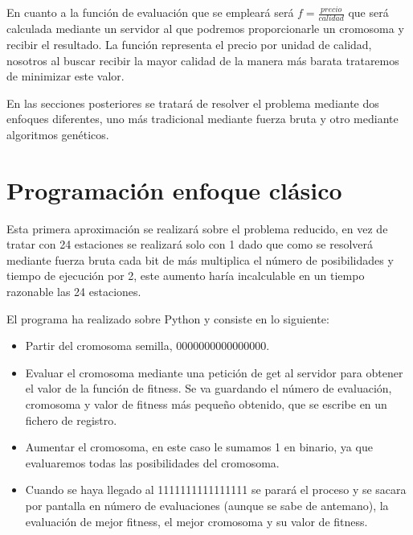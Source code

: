\documentclass[12pt, spanish, pdftex]{UC3M_document}
\begin{document}
En cuanto a la función de evaluación que se empleará será $f=\frac {precio} {calidad}$ que será calculada mediante un servidor al que podremos proporcionarle un cromosoma y recibir el resultado. La función representa el precio por unidad de calidad, nosotros al buscar recibir la mayor calidad de la manera más barata trataremos de minimizar este valor.

En las secciones posteriores se tratará de resolver el problema mediante dos enfoques diferentes, uno más tradicional mediante fuerza bruta y otro mediante algoritmos genéticos.

\section{Programación enfoque clásico}
Esta primera aproximación se realizará sobre el problema reducido, en vez de tratar con 24 estaciones se realizará solo con 1 dado que como se resolverá mediante fuerza bruta cada bit de más multiplica el número de posibilidades y tiempo de ejecución por 2, este aumento haría incalculable en un tiempo razonable las 24 estaciones.

El programa ha realizado sobre Python y consiste en lo siguiente:
\begin{itemize}
	\item Partir del cromosoma semilla, 0000000000000000.
	\item Evaluar el cromosoma mediante una petición de get al servidor para obtener el valor de la función de fitness. Se va guardando el número de evaluación, cromosoma y valor de fitness más pequeño obtenido, que se escribe en un fichero de registro.
	\item Aumentar el cromosoma, en este caso le sumamos 1 en binario, ya que evaluaremos todas las posibilidades del cromosoma.
	\item Cuando se haya llegado al 1111111111111111 se parará el proceso y se sacara por pantalla en número de evaluaciones (aunque se sabe de antemano), la evaluación de mejor fitness, el mejor cromosoma y su valor de fitness.
\end{itemize}
\end{document}
